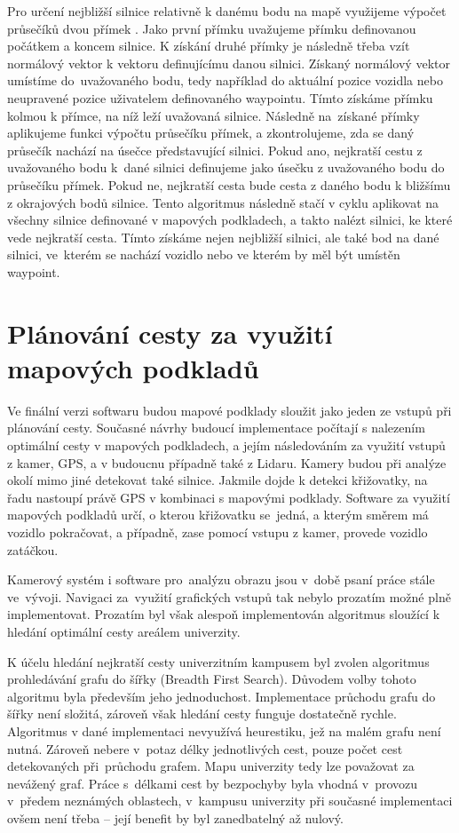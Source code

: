 \documentclass[czech, bachelor]{diploma}
\begin{document}
Pro určení nejbližší silnice relativně k danému bodu na mapě využijeme výpočet průsečíků dvou přímek
\cite{line-line-intersection-source}.  Jako první přímku uvažujeme přímku definovanou počátkem a koncem silnice. K získání druhé
přímky je následně třeba vzít normálový vektor k vektoru definujícímu danou silnici. Získaný normálový vektor umístíme
do~uvažovaného bodu, tedy například do aktuální pozice vozidla nebo neupravené pozice uživatelem definovaného waypointu. Tímto
získáme přímku kolmou k přímce, na níž leží uvažovaná silnice. Následně na~získané přímky aplikujeme funkci výpočtu průsečíku
přímek, a zkontrolujeme, zda se daný průsečík nachází na úsečce představující silnici. Pokud ano, nejkratší cestu z uvažovaného
bodu k~dané silnici definujeme jako úsečku z uvažovaného bodu do průsečíku přímek. Pokud ne, nejkratší cesta bude cesta z daného
bodu k bližšímu z okrajových bodů silnice. Tento algoritmus následně stačí v cyklu aplikovat na všechny silnice definované
v mapových podkladech, a takto nalézt silnici, ke které vede nejkratší cesta. Tímto získáme nejen nejbližší silnici, ale také bod
na dané silnici, ve~kterém se nachází vozidlo nebo ve kterém by měl být umístěn waypoint.

\section{Plánování cesty za využití mapových podkladů}

Ve finální verzi softwaru budou mapové podklady sloužit jako jeden ze vstupů při plánování cesty. Současné návrhy budoucí
implementace počítají s nalezením optimální cesty v mapových podkladech, a jejím následováním za využití vstupů z kamer, GPS, 
a v budoucnu případně také z Lidaru. Kamery budou při analýze okolí mimo jiné detekovat také silnice. Jakmile dojde k detekci
křižovatky, na řadu nastoupí právě GPS v kombinaci s mapovými podklady. Software za využití mapových podkladů určí, o kterou
křižovatku se~jedná, a kterým směrem má vozidlo pokračovat, a případně, zase pomocí vstupu z kamer, provede vozidlo zatáčkou.

Kamerový systém i software pro~analýzu obrazu jsou v~době psaní práce stále ve~vývoji. Navigaci za~využití grafických vstupů
tak nebylo prozatím možné plně implementovat. Prozatím byl však alespoň implementován algoritmus sloužící k hledání optimální
cesty areálem univerzity.

K účelu hledání nejkratší cesty univerzitním kampusem byl zvolen algoritmus prohledávání grafu do šířky (Breadth First Search).
Důvodem volby tohoto algoritmu byla především jeho jednoduchost. Implementace průchodu grafu do šířky není složitá, zároveň však
hledání cesty funguje dostatečně rychle. Algoritmus v dané implementaci nevyužívá heurestiku, jež na malém grafu není nutná.
Zároveň nebere v~potaz délky jednotlivých cest, pouze počet cest detekovaných při~průchodu grafem. Mapu univerzity tedy lze 
považovat za nevážený graf. Práce s~délkami cest by bezpochyby byla vhodná v~provozu v~předem neznámých oblastech, v~kampusu 
univerzity při současné implementaci ovšem není třeba -- její benefit by byl zanedbatelný až nulový.
\end{document}
